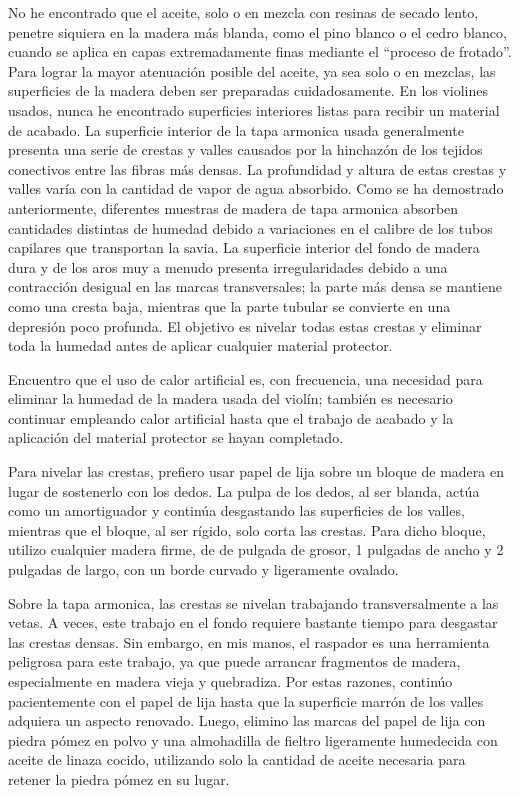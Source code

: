 \documentclass[12pt]{book}
\begin{document}
No he encontrado que el aceite, solo o en mezcla con resinas de secado lento, penetre siquiera en la madera más blanda, como el pino blanco o el cedro blanco, cuando se aplica en capas extremadamente finas mediante el ``proceso de frotado''. Para lograr la mayor atenuación posible del aceite, ya sea solo o en mezclas, las superficies de la madera deben ser preparadas cuidadosamente. En los violines usados, nunca he encontrado superficies interiores listas para recibir un material de acabado. La superficie interior de la tapa armonica usada generalmente presenta una serie de crestas y valles causados por la hinchazón de los tejidos conectivos entre las fibras más densas. La profundidad y altura de estas crestas y valles varía con la cantidad de vapor de agua absorbido. Como se ha demostrado anteriormente, diferentes muestras de madera de tapa armonica absorben cantidades distintas de humedad debido a variaciones en el calibre de los tubos capilares que transportan la savia. La superficie interior del fondo de madera dura y de los aros muy a menudo presenta irregularidades debido a una contracción desigual en las marcas transversales; la parte más densa se mantiene como una cresta baja, mientras que la parte tubular se convierte en una depresión poco profunda. El objetivo es nivelar todas estas crestas y eliminar toda la humedad antes de aplicar cualquier material protector.

Encuentro que el uso de calor artificial es, con frecuencia, una necesidad para eliminar la humedad de la madera usada del violín; también es necesario continuar empleando calor artificial hasta que el trabajo de acabado y la aplicación del material protector se hayan completado.

Para nivelar las crestas, prefiero usar papel de lija sobre un bloque de madera en lugar de sostenerlo con los dedos. La pulpa de los dedos, al ser blanda, actúa como un amortiguador y continúa desgastando las superficies de los valles, mientras que el bloque, al ser rígido, solo corta las crestas. Para dicho bloque, utilizo cualquier madera firme, de  de pulgada de grosor, 1  pulgadas de ancho y 2  pulgadas de largo, con un borde curvado y ligeramente ovalado. 

Sobre la tapa armonica, las crestas se nivelan trabajando transversalmente a las vetas. A veces, este trabajo en el fondo requiere bastante tiempo para desgastar las crestas densas. Sin embargo, en mis manos, el raspador es una herramienta peligrosa para este trabajo, ya que puede arrancar fragmentos de madera, especialmente en madera vieja y quebradiza. Por estas razones, continúo pacientemente con el papel de lija hasta que la superficie marrón de los valles adquiera un aspecto renovado. Luego, elimino las marcas del papel de lija con piedra pómez en polvo y una almohadilla de fieltro ligeramente humedecida con aceite de linaza cocido, utilizando solo la cantidad de aceite necesaria para retener la piedra pómez en su lugar.
\end{document}
